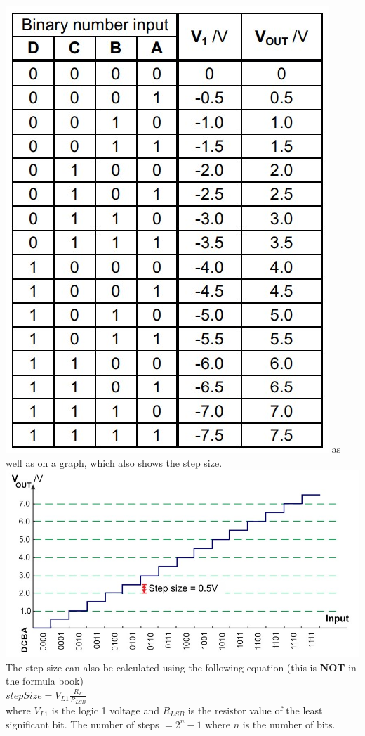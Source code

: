 \documentclass[a4paper,11pt, twocolumn]{article}
\begin{document}
\includegraphics[width=\linewidth]{dacBinary.jpg}
as well as on a graph, which also shows the step size.
\includegraphics[width=\linewidth]{dacGraph.jpg}
The step-size can also be calculated using the following equation (this is \textbf{NOT} in the formula book)\\
$\displaystyle stepSize = V_{L1} \frac{R_F}{R_{LSB}}$\\
where $V_{L1}$ is the logic 1 voltage and $R_{LSB}$ is the resistor value of the least significant bit. The number of steps $= 2^n -1$ where $n$ is the number of bits.
\end{document}
